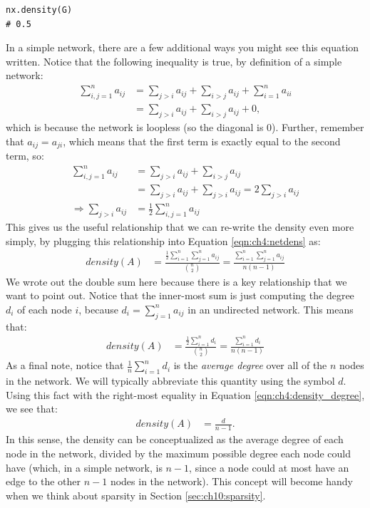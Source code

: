 \begin{lstlisting}[style=python]
nx.density(G)
# 0.5
\end{lstlisting}
In a simple network, there are a few additional ways you might see this equation written. Notice that the following inequality is true, by definition of a simple network:
\begin{align*}
    \sum_{i,j = 1}^n a_{ij} &= \sum_{j > i}a_{ij} + \sum_{i > j}a_{ij} + \sum_{i = 1}^n a_{ii} \\
    &= \sum_{j > i}a_{ij}+ \sum_{i > j}a_{ij} + 0,
\end{align*}
which is because the network is loopless (so the diagonal is $0$). Further, remember that $a_{ij} = a_{ji}$, which means that the first term is {exactly} equal to the second term, so:
\begin{align*}
    \sum_{i,j = 1}^n a_{ij} &= \sum_{j > i}a_{ij}+ \sum_{i > j}a_{ij} \\
    &= \sum_{j > i}a_{ij}+ \sum_{j > i}a_{ij} = 2\sum_{j > i}a_{ij} \\
    \Rightarrow \sum_{j > i}a_{ij} &= \frac{1}{2}\sum_{i,j = 1}^n a_{ij}
\end{align*}
This gives us the useful relationship that we can re-write the density even more simply, by plugging this relationship into Equation \eqref{eqn:ch4:netdens} as:
\begin{align*}
    density(A) &= \frac{\frac{1}{2}\sum_{i = 1}^n \sum_{j = 1}^n a_{ij}}{\binom n 2} = \frac{\sum_{i = 1}^n \sum_{j = 1}^n a_{ij}}{n(n - 1)}
\end{align*}
We wrote out the double sum here because there is a key relationship that we want to point out. Notice that the inner-most sum is just computing the degree $d_i$ of each node $i$, because $d_i = \sum_{j = 1}^n a_{ij}$ in an undirected network. This means that:
\begin{align}
    density(A) &= \frac{\frac{1}{2}\sum_{i = 1}^n d_i}{\binom n 2} = \frac{\sum_{i = 1}^n d_i}{n(n - 1)} \label{eqn:ch4:density_degree}
\end{align}
As a final note, notice that $\frac{1}{n}\sum_{i = 1}^n d_i$ is the \textit{average degree} over all of the $n$ nodes in the network. We will typically abbreviate this quantity using the symbol $d$. Using this fact with the right-most equality in Equation \eqref{eqn:ch4:density_degree}, we see that:
\begin{align*}
    density(A) &= \frac{d}{n - 1}.
\end{align*}
In this sense, the density can be conceptualized as the average degree of each node in the network, divided by the maximum possible degree each node could have (which, in a simple network, is $n-1$, since a node could at most have an edge to the other $n-1$ nodes in the network). This concept will become handy when we think about sparsity in Section \ref{sec:ch10:sparsity}.


